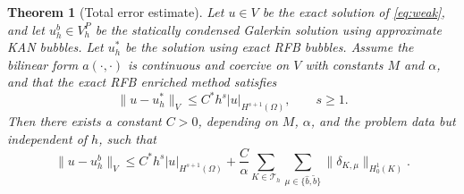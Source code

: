 \documentclass[11pt]{article}
\newcommand{\Th}{\mathcal{T}_h}
\newcommand{\Vp}{V_h^P}
\newcommand{\dom}{\Omega}
\newtheorem{theorem}{Theorem}[section]
\theoremstyle{remark}
\begin{document}
\begin{theorem}[Total error estimate]
\label{thm:total_error}
Let $u \in V$ be the exact solution of \eqref{eq:weak}, and let $u_h^b \in \Vp$ be the statically condensed Galerkin solution using approximate KAN bubbles. Let $u_h^*$ be the solution using exact RFB bubbles. Assume the bilinear form $a(\cdot,\cdot)$ is continuous and coercive on $V$ with constants $M$ and $\alpha$, and that the exact RFB enriched method satisfies
\begin{equation}
\|u - u_h^*\|_V \leq C^* h^s |u|_{H^{s+1}(\dom)}, \qquad s \geq 1.
\end{equation}
Then there exists a constant $C > 0$, depending on $M$, $\alpha$, and the problem data but independent of $h$, such that
\begin{equation}\label{eq:total_error}
\|u - u_h^b\|_V \leq C^* h^s |u|_{H^{s+1}(\dom)} + \frac{C}{\alpha}\sum_{K \in \Th}\sum_{\mu \in \{\widehat{b}, \widetilde{b}\}} \|\delta_{K,\mu}\|_{H^1_0(K)}.
\end{equation}
\end{theorem}
\end{document}
